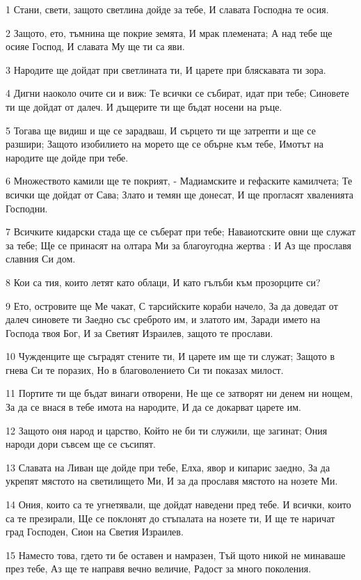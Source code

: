 \par 1 Стани, свети, защото светлина дойде за тебе, И славата Господна те осия.
\par 2 Защото, ето, тъмнина ще покрие земята, И мрак племената; А над тебе ще осияе Господ, И славата Му ще ти са яви.
\par 3 Народите ще дойдат при светлината ти, И царете при бляскавата ти зора.
\par 4 Дигни наоколо очите си и виж: Те всички се събират, идат при тебе; Синовете ти ще дойдат от далеч. И дъщерите ти ще бъдат носени на ръце.
\par 5 Тогава ще видиш и ще се зарадваш, И сърцето ти ще затрепти и ще се разшири; Защото изобилието на морето ще се обърне към тебе, Имотът на народите ще дойде при тебе.
\par 6 Множеството камили ще те покрият, - Мадиамските и гефаските камилчета; Те всички ще дойдат от Сава; Злато и темян ще донесат, И ще прогласят хваленията Господни.
\par 7 Всичките кидарски стада ще се съберат при тебе; Наваиотските овни ще служат за тебе; Ще се принасят на олтара Ми за благоугодна жертва : И Аз ще прославя славния Си дом.
\par 8 Кои са тия, които летят като облаци, И като гълъби към прозорците си?
\par 9 Ето, островите ще Ме чакат, С тарсийските кораби начело, За да доведат от далеч синовете ти Заедно със среброто им, и златото им, Заради името на Господа твоя Бог, И за Светият Израилев, защото те прослави.
\par 10 Чужденците ще съградят стените ти, И царете им ще ти служат; Защото в гнева Си те поразих, Но в благоволението Си ти показах милост.
\par 11 Портите ти ще бъдат винаги отворени, Не ще се затворят ни денем ни нощем, За да се внася в тебе имота на народите, И да се докарват царете им.
\par 12 Защото оня народ и царство, Който не би ти служили, ще загинат; Ония народи дори съвсем ще се съсипят.
\par 13 Славата на Ливан ще дойде при тебе, Елха, явор и кипарис заедно, За да укрепят мястото на светилището Ми, И за да прославя мястото на нозете Ми.
\par 14 Ония, които са те угнетявали, ще дойдат наведени пред тебе. И всички, които са те презирали, Ще се поклонят до стъпалата на нозете ти, И ще те наричат град Господен, Сион на Светия Израилев.
\par 15 Наместо това, гдето ти бе оставен и намразен, Тъй щото никой не минаваше през тебе, Аз ще те направя вечно величие, Радост за много поколения.
